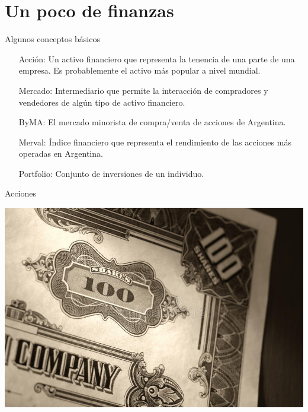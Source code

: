 \documentclass[12pt,aspectratio=169]{beamer}
\begin{document}
\section{Un poco de finanzas}

\begin{frame}{Algunos conceptos básicos}
\begin{itemize}
\item[Acción:] Un activo financiero que representa la tenencia de una parte de una empresa. Es probablemente el activo más popular a nivel mundial.

\item[Mercado:] Intermediario que permite la interacción de compradores y vendedores de algún tipo de activo financiero.

\item[ByMA:] El mercado minorista de compra/venta de acciones de Argentina.

\item[Merval:] Índice financiero que representa el rendimiento de las acciones más operadas en Argentina.

\item[Portfolio:] Conjunto de inversiones de un individuo.
\end{itemize}
\end{frame}

\begin{frame}{Acciones}
\begin{center}
	\includegraphics[width=.6\paperwidth]{stock.jpg}
\end{center}
\end{frame}
\end{document}
